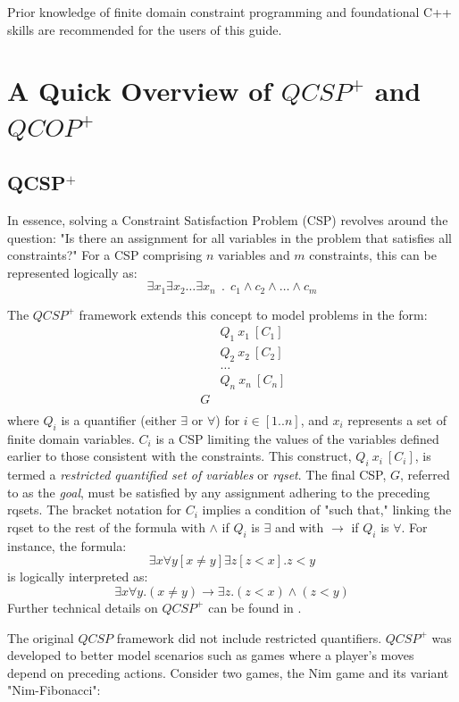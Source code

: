 \documentclass{article}
\begin{document}
Prior knowledge of finite domain constraint programming and foundational C++ skills are recommended for the users of this guide.

\section{A Quick Overview of $QCSP^+$ and $QCOP^+$}
\subsection{QCSP$^+$}
In essence, solving a Constraint Satisfaction Problem (CSP) revolves around the question: "Is there an assignment for all variables in the problem that satisfies all constraints?" For a CSP comprising $n$ variables and $m$ constraints, this can be represented logically as: 
$$\exists x_1 \exists x_2 \ldots \exists x_n~~.~~c_1 \wedge c_2 \wedge \ldots \wedge c_m $$

\noindent The $QCSP^+$ framework extends this concept to model problems in the form:
\begin{align*}
    &Q_1 ~ x_1 ~ [C_1]\\
    ~~&Q_2 ~ x_2 ~ [C_2]\\
    ~~~~&\ldots\\
    ~~~~~~&Q_n ~ x_n ~ [C_n]\\
    ~~~~~~~~G\\
\end{align*}
where $Q_i$ is a quantifier (either $\exists$ or $\forall$) for $i \in [1..n]$, and $x_i$ represents a set of finite domain variables. $C_i$ is a CSP limiting the values of the variables defined earlier to those consistent with the constraints. This construct, $Q_i ~ x_i ~ [C_i]$, is termed a {\em restricted quantified set of variables} or {\em rqset}. The final CSP, $G$, referred to as the {\em goal}, must be satisfied by any assignment adhering to the preceding rqsets. The bracket notation for $C_i$ implies a condition of "such that," linking the rqset to the rest of the formula with $\wedge$ if $Q_i$ is $\exists$ and with $\rightarrow$ if $Q_i$ is $\forall$. For instance, the formula: 
$$\exists x \forall y [x \neq y] \exists z [z < x] . z < y$$ 
is logically interpreted as: 
$$\exists x \forall y . (x \neq y) \rightarrow \exists z . (z < x) \wedge (z < y)$$ 
Further technical details on $QCSP^+$ can be found in \cite{10.5555/1625275.1625280}.

The original $QCSP$ framework \cite{10.1007/3-540-46135-3_25} did not include restricted quantifiers. $QCSP^+$ was developed to better model scenarios such as games where a player's moves depend on preceding actions. Consider two games, the Nim game and its variant "Nim-Fibonacci": 
\end{document}
